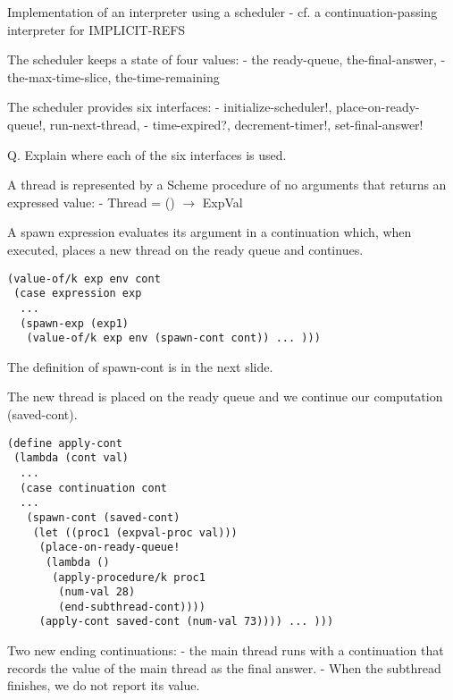 \documentclass{article}
\begin{document}
\begin{huge}

Implementation of an interpreter using a scheduler \al
- cf. a continuation-passing interpreter for IMPLICIT-REFS

The scheduler keeps a state of four values: \al
- the ready-queue, the-final-answer, \al
- the-max-time-slice, the-time-remaining

The scheduler provides six interfaces: \al
- initialize-scheduler!, place-on-ready-queue!,  run-next-thread, \al
- time-expired?, decrement-timer!, set-final-answer!

Q. Explain where each of the six interfaces is used.

A thread is represented by a Scheme procedure of no arguments that returns an expressed value: \al
- Thread = () $\rightarrow$ ExpVal


A spawn expression evaluates its argument in a continuation which, when executed, places a new thread on the ready queue and continues.

\begin{lstlisting}
(value-of/k exp env cont
 (case expression exp 
  ...
  (spawn-exp (exp1) 
   (value-of/k exp env (spawn-cont cont)) ... )))
\end{lstlisting}

The definition of spawn-cont is in the next slide.

The new thread is placed on the ready queue and we continue our computation (saved-cont).

\begin{lstlisting}
(define apply-cont
 (lambda (cont val)
  ...
  (case continuation cont
  ...
   (spawn-cont (saved-cont) 
    (let ((proc1 (expval-proc val)))
     (place-on-ready-queue!
      (lambda ()
       (apply-procedure/k proc1
        (num-val 28)
        (end-subthread-cont))))
     (apply-cont saved-cont (num-val 73)))) ... )))
\end{lstlisting}


Two new ending continuations: \al
- the main thread runs with a continuation that records the value of the main thread as the final answer. \al
- When the subthread finishes, we do not report its value. \al


\end{huge}
\end{document}
